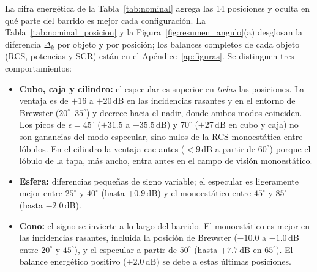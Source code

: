 \documentclass[11pt,a4paper]{report}
\newcommand{\dB}{\,\mathrm{dB}}
\begin{document}
La cifra energética de la Tabla~\ref{tab:nominal} agrega las 14 posiciones
y oculta en qué parte del barrido es mejor cada configuración. La
Tabla~\ref{tab:nominal_posicion} y la Figura~\ref{fig:resumen_angulo}(a)
desglosan la diferencia $\Delta_k$ por objeto y por posición; los balances
completos de cada objeto (RCS, potencias y SCR) están en el
Apéndice~\ref{ap:figuras}. Se distinguen tres comportamientos:
\begin{itemize}[itemsep=2pt]
  \item \textbf{Cubo, caja y cilindro:} el especular es superior en
  \emph{todas} las posiciones. La ventaja es de $+16$ a $+20\dB$ en las
  incidencias rasantes y en el entorno de Brewster ($20^\circ$--$35^\circ$) y
  decrece hacia el nadir, donde ambos modos coinciden. Los picos de
  $\epsilon=45^\circ$ ($+31.5$ a $+35.5\dB$) y $70^\circ$ ($+27\dB$ en cubo y
  caja) no son ganancias del modo especular, sino nulos de la RCS
  monoestática entre lóbulos. En el cilindro la ventaja cae antes
  ($<9\dB$ a partir de $60^\circ$) porque el lóbulo de la tapa, más ancho,
  entra antes en el campo de visión monoestático.
  \item \textbf{Esfera:} diferencias pequeñas de signo variable; el especular
  es ligeramente mejor entre $25^\circ$ y $40^\circ$ (hasta $+0.9\dB$) y el
  monoestático entre $45^\circ$ y $85^\circ$ (hasta $-2.0\dB$).
  \item \textbf{Cono:} el signo se invierte a lo largo del barrido. El
  monoestático es mejor en las incidencias rasantes, incluida la posición de
  Brewster ($-10.0$ a $-1.0\dB$ entre $20^\circ$ y $45^\circ$), y el
  especular a partir de $50^\circ$ (hasta $+7.7\dB$ en $65^\circ$). El
  balance energético positivo ($+2.0\dB$) se debe a estas últimas
  posiciones.
\end{itemize}
\end{document}
